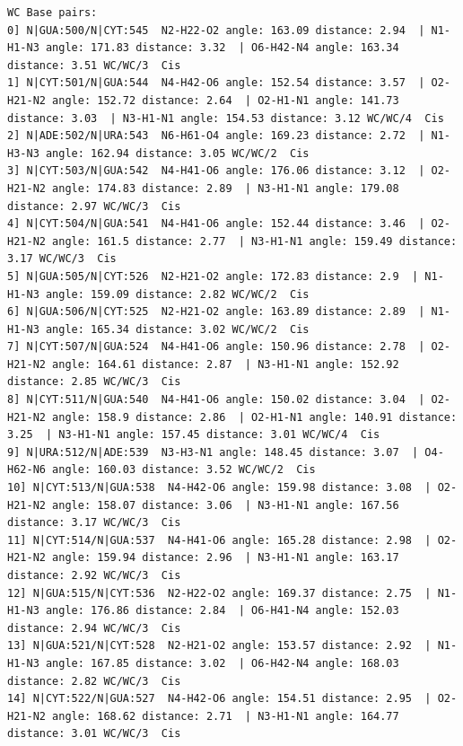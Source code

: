 \documentclass[12pt]{article}
\begin{document}
\begin{appendices}
\begin{scriptsize}
\begin{lstlisting}
WC Base pairs: 
0] N|GUA:500/N|CYT:545  N2-H22-O2 angle: 163.09 distance: 2.94  | N1-H1-N3 angle: 171.83 distance: 3.32  | O6-H42-N4 angle: 163.34 distance: 3.51 WC/WC/3  Cis
1] N|CYT:501/N|GUA:544  N4-H42-O6 angle: 152.54 distance: 3.57  | O2-H21-N2 angle: 152.72 distance: 2.64  | O2-H1-N1 angle: 141.73 distance: 3.03  | N3-H1-N1 angle: 154.53 distance: 3.12 WC/WC/4  Cis
2] N|ADE:502/N|URA:543  N6-H61-O4 angle: 169.23 distance: 2.72  | N1-H3-N3 angle: 162.94 distance: 3.05 WC/WC/2  Cis
3] N|CYT:503/N|GUA:542  N4-H41-O6 angle: 176.06 distance: 3.12  | O2-H21-N2 angle: 174.83 distance: 2.89  | N3-H1-N1 angle: 179.08 distance: 2.97 WC/WC/3  Cis
4] N|CYT:504/N|GUA:541  N4-H41-O6 angle: 152.44 distance: 3.46  | O2-H21-N2 angle: 161.5 distance: 2.77  | N3-H1-N1 angle: 159.49 distance: 3.17 WC/WC/3  Cis
5] N|GUA:505/N|CYT:526  N2-H21-O2 angle: 172.83 distance: 2.9  | N1-H1-N3 angle: 159.09 distance: 2.82 WC/WC/2  Cis
6] N|GUA:506/N|CYT:525  N2-H21-O2 angle: 163.89 distance: 2.89  | N1-H1-N3 angle: 165.34 distance: 3.02 WC/WC/2  Cis
7] N|CYT:507/N|GUA:524  N4-H41-O6 angle: 150.96 distance: 2.78  | O2-H21-N2 angle: 164.61 distance: 2.87  | N3-H1-N1 angle: 152.92 distance: 2.85 WC/WC/3  Cis
8] N|CYT:511/N|GUA:540  N4-H41-O6 angle: 150.02 distance: 3.04  | O2-H21-N2 angle: 158.9 distance: 2.86  | O2-H1-N1 angle: 140.91 distance: 3.25  | N3-H1-N1 angle: 157.45 distance: 3.01 WC/WC/4  Cis
9] N|URA:512/N|ADE:539  N3-H3-N1 angle: 148.45 distance: 3.07  | O4-H62-N6 angle: 160.03 distance: 3.52 WC/WC/2  Cis
10] N|CYT:513/N|GUA:538  N4-H42-O6 angle: 159.98 distance: 3.08  | O2-H21-N2 angle: 158.07 distance: 3.06  | N3-H1-N1 angle: 167.56 distance: 3.17 WC/WC/3  Cis
11] N|CYT:514/N|GUA:537  N4-H41-O6 angle: 165.28 distance: 2.98  | O2-H21-N2 angle: 159.94 distance: 2.96  | N3-H1-N1 angle: 163.17 distance: 2.92 WC/WC/3  Cis
12] N|GUA:515/N|CYT:536  N2-H22-O2 angle: 169.37 distance: 2.75  | N1-H1-N3 angle: 176.86 distance: 2.84  | O6-H41-N4 angle: 152.03 distance: 2.94 WC/WC/3  Cis
13] N|GUA:521/N|CYT:528  N2-H21-O2 angle: 153.57 distance: 2.92  | N1-H1-N3 angle: 167.85 distance: 3.02  | O6-H42-N4 angle: 168.03 distance: 2.82 WC/WC/3  Cis
14] N|CYT:522/N|GUA:527  N4-H42-O6 angle: 154.51 distance: 2.95  | O2-H21-N2 angle: 168.62 distance: 2.71  | N3-H1-N1 angle: 164.77 distance: 3.01 WC/WC/3  Cis


\end{lstlisting}
\end{scriptsize}
\end{appendices}
\end{document}
